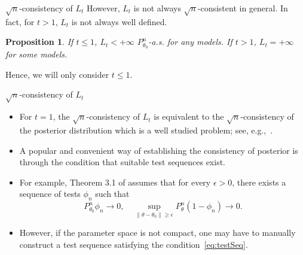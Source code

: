\documentclass{beamer}
\theoremstyle{plain}
\newtheorem{proposition}{ Proposition}
\theoremstyle{definition}
\theoremstyle{remark}
\begin{document}
\begin{frame}{$\sqrt{n}$-consistency of $L_t$}
    However, $L_t$ is not always $\sqrt{n}$-consistent in general. In fact, for $t>1$, $L_t$ is not always well defined.
\begin{proposition}
    If $t\leq 1$, $L_t< +\infty$ $P_{\theta_0}^n$-a.s. for any models. If $t> 1$, $L_t = +\infty$ for some models.
    \label{exprop}
\end{proposition}
Hence, we will only consider $t\leq 1$.
\end{frame}
\begin{frame}{$\sqrt{n}$-consistency of $L_t$}
    \begin{itemize}
        \item
    For $t=1$, the $\sqrt{n}$-consistency of $L_t$ is equivalent to the $\sqrt{n}$-consistency of the posterior distribution which is a well studied problem; see, e.g.,~\cite{ghosal2000,Shen2001Rates,vaart2007convergence}.
        \item
A popular and convenient way of establishing the consistency of posterior is through the condition that suitable test sequences exist.
        \item
For example, Theorem 3.1 of \cite{Kleijn2012The} assumes that for every $\epsilon>0$, there exists a sequence of tests $\phi_n$ such that
\begin{equation}\label{eq:testSeq}
    P_{\theta_0}^n\phi_n\to 0,\quad \sup_{\|\theta-\theta_0\|\geq \epsilon} P_\theta^n(1-\phi_n)\to 0.
\end{equation}
        \item
However, if the parameter space is not compact, one may have to manually construct a test sequence satisfying the condition~\eqref{eq:testSeq}.
\end{itemize}
\end{frame}
\end{document}
